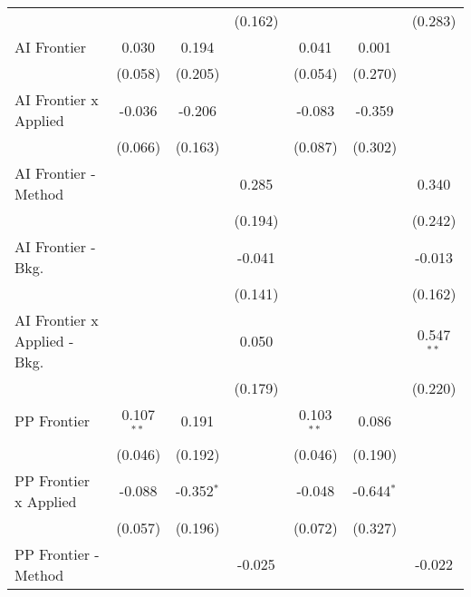 \begin{tabular}{lcccccc}
                                  &                &               & (0.162)       &                &               & (0.283)\\   
   AI Frontier                    & 0.030          & 0.194         &               & 0.041          & 0.001         &   \\   
                                  & (0.058)        & (0.205)       &               & (0.054)        & (0.270)       &   \\   
   AI Frontier x Applied          & -0.036         & -0.206        &               & -0.083         & -0.359        &   \\   
                                  & (0.066)        & (0.163)       &               & (0.087)        & (0.302)       &   \\   
   AI Frontier - Method           &                &               & 0.285         &                &               & 0.340\\   
                                  &                &               & (0.194)       &                &               & (0.242)\\   
   AI Frontier - Bkg.             &                &               & -0.041        &                &               & -0.013\\   
                                  &                &               & (0.141)       &                &               & (0.162)\\   
   AI Frontier x Applied - Bkg.   &                &               & 0.050         &                &               & 0.547$^{**}$\\   
                                  &                &               & (0.179)       &                &               & (0.220)\\   
   PP Frontier                    & 0.107$^{**}$   & 0.191         &               & 0.103$^{**}$   & 0.086         &   \\   
                                  & (0.046)        & (0.192)       &               & (0.046)        & (0.190)       &   \\   
   PP Frontier x Applied          & -0.088         & -0.352$^{*}$  &               & -0.048         & -0.644$^{*}$  &   \\   
                                  & (0.057)        & (0.196)       &               & (0.072)        & (0.327)       &   \\   
   PP Frontier - Method           &                &               & -0.025        &                &               & -0.022\\   

\end{tabular}
